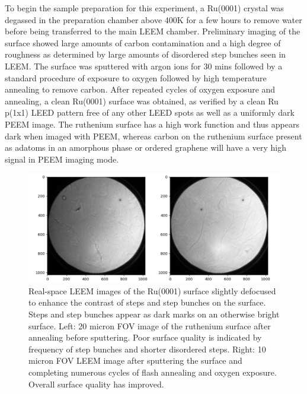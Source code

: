 To begin the sample preparation for this experiment, a Ru(0001) crystal was degassed in the preparation chamber above 400K for a few hours to remove water before being transferred to the main LEEM chamber. Preliminary imaging of the surface showed large amounts of carbon contamination and a high degree of roughness as determined by large amounts of disordered step bunches seen in LEEM. The surface was sputtered with argon ions for 30 mins followed by a standard procedure of exposure to oxygen followed by high temperature annealing to remove carbon. After repeated cycles of oxygen exposure and annealing, a clean Ru(0001) surface was obtained, as verified by a clean Ru p(1x1) LEED pattern free of any other LEED spots as well as a uniformly dark PEEM image. The ruthenium surface has a high work function and thus appears dark when imaged with PEEM, whereas carbon on the ruthenium surface present as adatoms in an amorphous phase or ordered graphene will have a very high signal in PEEM imaging mode.

\begin{figure}
        \includegraphics[scale=1.05]{./figs/LEEM-Ru-Before-After-150.png}
    \caption{Real-space LEEM images of the Ru(0001) surface slightly defocused to enhance the contrast of steps and step bunches on the surface. Steps and step bunches appear as dark marks on an otherwise bright surface. Left: 20 micron FOV image of the ruthenium surface after annealing before sputtering. Poor surface quality is indicated by frequency of step bunches and shorter disordered steps. Right: 10 micron FOV LEEM image after sputtering the surface and completing numerous cycles of flash annealing and oxygen exposure. Overall surface quality has improved.
    }
    \label{fig:LEEM-Ru-before-after}
\end{figure}



